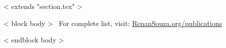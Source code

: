 ~< extends "section.tex" >~

~< block body >~
\vspace{-8mm}
\hfill
For complete list, visit: \href{https://renansouza.org/publications}{RenanSouza.org/publications}
\vspace{2mm}

\renewcommand*{\bibfont}{\small}

\begin{refsection}
\nocite{*}
\printbibliography[heading=none] %
\end{refsection}

~< endblock body >~
